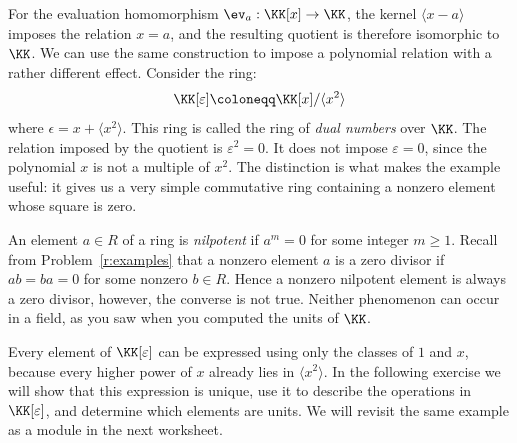 \documentclass[12pt,reqno]{amsart}
\begin{document}
\hrulefill
 
 
For the evaluation homomorphism $\ev_a:\KK[x]\to\KK$, the kernel $\langle x-a\rangle$ imposes the relation $x=a$, and the resulting quotient is therefore isomorphic to $\KK$. We can use the same construction to impose a polynomial relation with a rather different effect. Consider the ring:
\[
 \KK[\varepsilon]\coloneqq \KK[x]/\langle x^2\rangle
\]
where $\epsilon = x+\langle x^2\rangle$. This ring is called the ring of \emph{dual numbers} over $\KK$. The relation imposed by the quotient is $\varepsilon^2=0$. It does not impose $\varepsilon=0$, since the polynomial $x$ is not a multiple of $x^2$. The distinction is what makes the example useful: it gives us a very simple commutative ring containing a nonzero element whose square is zero.
 
An element $a\in R$ of a ring is \emph{nilpotent} if $a^m=0$ for some integer $m\geq1$. Recall from Problem~\ref{r:examples} that a nonzero element $a$ is a zero divisor if $ab=ba=0$ for some nonzero $b \in R$. Hence a nonzero nilpotent element is always a zero divisor, however, the converse is not true. Neither phenomenon can occur in a field, as you saw when you computed the units of $\KK$. 

Every element of $\KK[\varepsilon]$ can be expressed using only the classes of $1$ and $x$, because every higher power of $x$ already lies in $\langle x^2\rangle$. In the following exercise we will show that this expression is unique, use it to describe the operations in $\KK[\varepsilon]$, and determine which elements are units. We will revisit the same example as a module in the next worksheet.
 
\hrulefill
 
\end{document}
